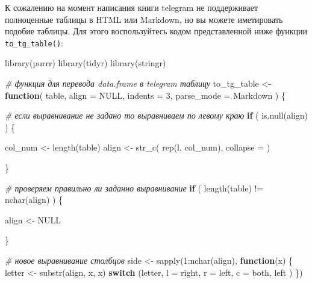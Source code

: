 \documentclass[
]{book}
\newenvironment{Shaded}{\begin{snugshade}}{\end{snugshade}}
\newcommand{\AttributeTok}[1]{\textcolor[rgb]{0.77,0.63,0.00}{#1}}
\newcommand{\CommentTok}[1]{\textcolor[rgb]{0.56,0.35,0.01}{\textit{#1}}}
\newcommand{\ConstantTok}[1]{\textcolor[rgb]{0.00,0.00,0.00}{#1}}
\newcommand{\ControlFlowTok}[1]{\textcolor[rgb]{0.13,0.29,0.53}{\textbf{#1}}}
\newcommand{\DecValTok}[1]{\textcolor[rgb]{0.00,0.00,0.81}{#1}}
\newcommand{\FunctionTok}[1]{\textcolor[rgb]{0.00,0.00,0.00}{#1}}
\newcommand{\NormalTok}[1]{#1}
\newcommand{\OtherTok}[1]{\textcolor[rgb]{0.56,0.35,0.01}{#1}}
\newcommand{\SpecialCharTok}[1]{\textcolor[rgb]{0.00,0.00,0.00}{#1}}
\newcommand{\StringTok}[1]{\textcolor[rgb]{0.31,0.60,0.02}{#1}}
\begin{document}
К сожалению на момент написания книги telegram не поддерживает полноценные таблицы в HTML или Markdown, но вы можете иметировать подобие таблицы. Для этого воспользуйтесь кодом представленной ниже функции \texttt{to\_tg\_table()}:

\begin{Shaded}
\begin{Highlighting}[]
\FunctionTok{library}\NormalTok{(purrr)}
\FunctionTok{library}\NormalTok{(tidyr)}
\FunctionTok{library}\NormalTok{(stringr)}

\CommentTok{\# функция для перевода data.frame в telegram таблицу }
\NormalTok{to\_tg\_table }\OtherTok{\textless{}{-}} \ControlFlowTok{function}\NormalTok{( table, }\AttributeTok{align =} \ConstantTok{NULL}\NormalTok{, }\AttributeTok{indents =} \DecValTok{3}\NormalTok{, }\AttributeTok{parse\_mode =} \StringTok{\textquotesingle{}Markdown\textquotesingle{}}\NormalTok{ ) \{}
  
  \CommentTok{\# если выравнивание не задано то выравниваем по левому краю}
  \ControlFlowTok{if}\NormalTok{ ( }\FunctionTok{is.null}\NormalTok{(align) ) \{}
    
\NormalTok{    col\_num }\OtherTok{\textless{}{-}} \FunctionTok{length}\NormalTok{(table)}
\NormalTok{    align   }\OtherTok{\textless{}{-}} \FunctionTok{str\_c}\NormalTok{( }\FunctionTok{rep}\NormalTok{(}\StringTok{\textquotesingle{}l\textquotesingle{}}\NormalTok{, col\_num), }\AttributeTok{collapse =} \StringTok{\textquotesingle{}\textquotesingle{}}\NormalTok{ )}
  
\NormalTok{  \}}
  
  \CommentTok{\# проверяем правильно ли заданно выравнивание}
  \ControlFlowTok{if}\NormalTok{ ( }\FunctionTok{length}\NormalTok{(table) }\SpecialCharTok{!=} \FunctionTok{nchar}\NormalTok{(align) ) \{}
    
\NormalTok{    align }\OtherTok{\textless{}{-}} \ConstantTok{NULL}
    
\NormalTok{  \}}
  
  \CommentTok{\# новое выравнивание столбцов }
\NormalTok{  side }\OtherTok{\textless{}{-}} \FunctionTok{sapply}\NormalTok{(}\DecValTok{1}\SpecialCharTok{:}\FunctionTok{nchar}\NormalTok{(align), }
         \ControlFlowTok{function}\NormalTok{(x) \{ }
\NormalTok{           letter }\OtherTok{\textless{}{-}} \FunctionTok{substr}\NormalTok{(align, x, x)}
           \ControlFlowTok{switch}\NormalTok{ (letter,}
                   \StringTok{\textquotesingle{}l\textquotesingle{}} \OtherTok{=} \StringTok{\textquotesingle{}right\textquotesingle{}}\NormalTok{,}
                   \StringTok{\textquotesingle{}r\textquotesingle{}} \OtherTok{=} \StringTok{\textquotesingle{}left\textquotesingle{}}\NormalTok{,}
                   \StringTok{\textquotesingle{}c\textquotesingle{}} \OtherTok{=} \StringTok{\textquotesingle{}both\textquotesingle{}}\NormalTok{,}
                   \StringTok{\textquotesingle{}left\textquotesingle{}}
\NormalTok{           )}
\NormalTok{  \})}
  

\end{Highlighting}
\end{Shaded}
\end{document}

